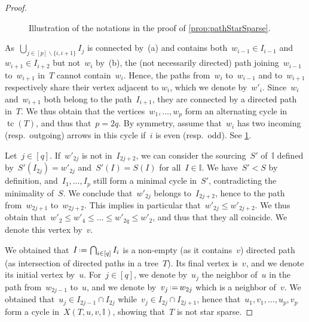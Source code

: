\documentclass{amsart}
\theoremstyle{definition}
\newcommand{\ssm}{\smallsetminus} %
\newcommand{\eqdef}{\mbox{\,\raisebox{0.2ex}{\scriptsize\ensuremath{\mathrm:}}\ensuremath{=}\,}} %
\DeclareMathOperator{\tc}{tc} %
\newcommand{\II}{\mathbb I} %
\begin{document}
\begin{proof}
\begin{figure}[b]
{
	}
	\caption{Illustration of the notations in the proof of \cref{prop:pathStarSparse}.}
	\label{fig:pathStarSparse}
\end{figure}

As~$\bigcup_{j \in [p] \ssm \{i,i+1\}} I_j$ is connected by~(a) and contains both~$w_{i-1} \in I_{i-1}$ and~$w_{i+1} \in I_{i+2}$ but not~$w_i$ by~(b), the (not necessarily directed) path joining~$w_{i-1}$ to~$w_{i+1}$ in~$T$ cannot contain~$w_i$.
Hence, the paths from~$w_i$ to~$w_{i-1}$ and to~$w_{i+1}$ respectively share their vertex adjacent to $w_i$, which we denote by~$w'_i$.
Since~$w_i$ and~$w_{i+1}$ both belong to the path~$I_{i+1}$, they are connected by a directed path in~$T$.
We thus obtain that the vertices~$w_1, \dots, w_p$ form an alternating cycle in~$\tc(T)$, and thus that~$p = 2q$.
By symmetry, assume that~$w_i$ has two incoming (resp.~outgoing) arrows in this cycle if~$i$ is even (resp.~odd).
See \cref{fig:pathStarSparse}.

Let~$j \in [q]$.
If~$w'_{2j}$ is not in~$I_{2j+2}$, we can consider the sourcing~$S'$ of~$\II$ defined by~$S'(I_{2j}) = w'_{2j}$ and~$S'(I) = S(I)$ for all~$I \in \II$.
We have~$S' < S$ by definition, and~$I_1, \dots, I_p$ still form a minimal cycle in~$S'$, contradicting the minimality of~$S$.
We conclude that~$w'_{2j}$ belongs to~$I_{2j+2}$, hence to the path from~$w_{2j+1}$ to~$w_{2j+2}$.
This implies in particular that~$w'_{2j} \le w'_{2j+2}$.
We thus obtain that~$w'_2 \le w'_4 \le \dots \le w'_{2q} \le w'_2$, and thus that they all coincide.
We denote this vertex by~$v$.

We obtained that~$I \eqdef \bigcap_{i \in [q]} I_i$ is a non-empty (as it contains~$v$) directed path (as intersection of directed paths in a tree~$T$).
Its final vertex is~$v$, and we denote its initial vertex by~$u$.
For~$j \in [q]$, we denote by~$u_j$ the neighbor of~$u$ in the path from~$w_{2j-1}$ to~$u$, and we denote by~$v_j \eqdef w_{2j}$ which is a neighbor of~$v$.
We obtained that~$u_j \in I_{2j-1} \cap I_{2j}$ while~$v_j \in I_{2j} \cap I_{2j+1}$, hence that~$u_1, v_1, \dots, u_p, v_p$ form a cycle in~$X(T, u, v, \II)$, showing that~$T$ is not star sparse.
\end{proof}
\end{document}

